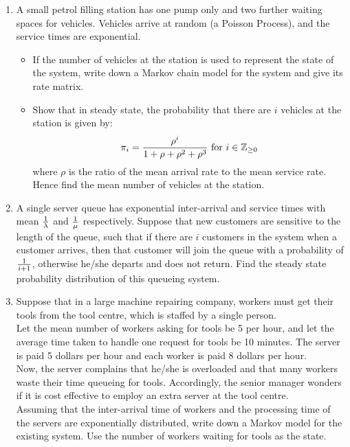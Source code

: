 \documentclass[12pt]{article}
\begin{document}
\begin{enumerate}
\item A small petrol filling station has one pump only and two further waiting spaces for vehicles. Vehicles arrive at random (a Poisson Process), and the service times are exponential.
    \begin{itemize}
    \item If the number of vehicles at the station is used to represent the state of the system, write down a Markov chain model for the system and give its rate matrix.
    \item Show that in steady state, the probability that there are $i$ vehicles at the station is given by:
        $$\pi_i={\rho^i\over 1+\rho+\rho^2+\rho^3}\text{ for }i\in\mathbb{Z}_{\geq0}$$
        where $\rho$ is the ratio of the mean arrival rate to the mean service rate. Hence find the mean number of vehicles at the station.
    \end{itemize}

\item A single server queue has exponential inter-arrival and service times with mean ${1\over\lambda}$ and ${1\over\mu}$ respectively. Suppose that new customers are sensitive to the length of the queue, such that if there are $i$ customers in the system when a customer arrives, then that customer will join the queue with a probability of ${1\over i+1}$, otherwise he/she departs and does not return. Find the steady state probability distribution of this queueing system.

\item Suppose that in a large machine repairing company, workers must get their tools from the tool centre, which is staffed by a single person.\\

Let the mean number of workers asking for tools be 5 per hour, and let the average time taken to handle one request for tools be 10 minutes. The server is paid 5 dollars per hour and each worker is paid 8 dollars per hour.\\

Now, the server complains that he/she is overloaded and that many workers waste their time queueing for tools. Accordingly, the senior manager wonders if it is cost effective to employ an extra server at the tool centre.\\

Assuming that the inter-arrival time of workers and the processing time of the servers are exponentially distributed, write down a Markov model for the existing system. Use the number of workers waiting for tools as the state.\\


\end{enumerate}
\end{document}
